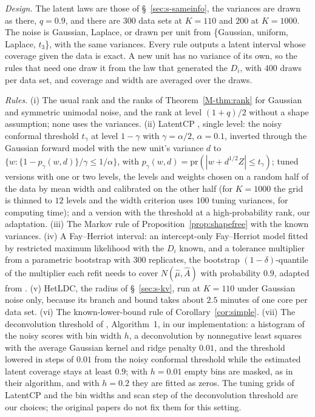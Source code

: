 \documentclass[12pt]{article}
\renewcommand{\_}{\usc\allowbreak}
\theoremstyle{definition}
\numberwithin{equation}{section}
\newcommand{\pr}{\mathrm{pr}}
\begin{document}
\emph{Design.} The latent laws are those of \S~\ref{sec:s-sameinfo}, the variances are drawn as there, $q = 0.9$, and there are $300$ data sets at $K = 110$ and $200$ at $K = 1000$. The noise is Gaussian, Laplace, or drawn per unit from \{Gaussian, uniform, Laplace, $t_3$\}, with the same variances. Every rule outputs a latent interval whose coverage given the data is exact. A new unit has no variance of its own, so the rules that need one draw it from the law that generated the $D_i$, with $400$ draws per data set, and coverage and width are averaged over the draws.

\emph{Rules.} (i) The usual rank and the ranks of Theorem~\ref{M-thm:rank} for Gaussian and symmetric unimodal noise, and the rank at level $(1 + q)/2$ without a shape assumption; none uses the variances. (ii) LatentCP \citep*{zheng2026}, single level: the noisy conformal threshold $t_\gamma$ at level $1 - \gamma$ with $\gamma = \alpha/2$, $\alpha = 0.1$, inverted through the Gaussian forward model with the new unit's variance $d$ to $\{w : \{1 - p_\gamma(w, d)\}/\gamma \le 1/\alpha\}$, with $p_\gamma(w, d) = \pr(|w + d^{1/2}Z| \le t_\gamma)$; tuned versions with one or two levels, the levels and weights chosen on a random half of the data by mean width and calibrated on the other half (for $K = 1000$ the grid is thinned to $12$ levels and the width criterion uses $100$ tuning variances, for computing time); and a version with the threshold at a high-probability rank, our adaptation. (iii) The Markov rule of Proposition~\ref{prop:shapefree} with the known variances. (iv) A Fay--Herriot interval: an intercept-only Fay--Herriot model fitted by restricted maximum likelihood with the $D_i$ known, and a tolerance multiplier from a parametric bootstrap with $300$ replicates, the bootstrap $(1 - \delta)$-quantile of the multiplier each refit needs to cover $N(\hat\mu, \hat A)$ with probability $0.9$, adapted from \citet*{chatterjee2008}. (v) HetLDC, the radius of \S~\ref{sec:s-kv}, run at $K = 110$ under Gaussian noise only, because its branch and bound takes about $2.5$ minutes of one core per data set. (vi) The known-lower-bound rule of Corollary~\ref{cor:simple}. (vii) The deconvolution threshold of \citet*{cohen2025}, Algorithm~1, in our implementation: a histogram of the noisy scores with bin width $h$, a deconvolution by nonnegative least squares with the average Gaussian kernel and ridge penalty $0.01$, and the threshold lowered in steps of $0.01$ from the noisy conformal threshold while the estimated latent coverage stays at least $0.9$; with $h = 0.01$ empty bins are masked, as in their algorithm, and with $h = 0.2$ they are fitted as zeros. The tuning grids of LatentCP and the bin widths and scan step of the deconvolution threshold are our choices; the original papers do not fix them for this setting.
\end{document}
